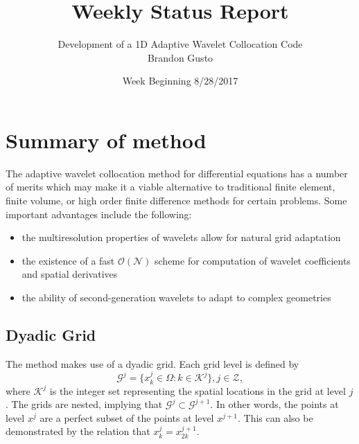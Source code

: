 \documentclass[11pt]{article}
\begin{document}
\title{Weekly Status Report}
\author{Development of a 1D Adaptive Wavelet Collocation Code \\
Brandon Gusto \\}
\date{Week Beginning 8/28/2017}

\maketitle
%
\section{Summary of method}
The adaptive wavelet collocation method for differential equations has a number of merits which may make it a viable
alternative to traditional finite element, finite volume, or high order finite difference methods for certain problems. 
Some important advantages include the following:
\begin{itemize}
    \item the multiresolution properties of wavelets allow for natural grid adaptation
    \item the existence of a fast $\mathcal{O}(\mathcal{N})$ scheme for computation of wavelet coefficients and 
          spatial derivatives
    \item the ability of second-generation wavelets to adapt to complex geometries
\end{itemize}
\subsection{Dyadic Grid}
The method makes use of a dyadic grid. Each grid level is defined by 
\begin{equation}
    \mathcal{G}^j= \{ x_{k}^{j} \in \Omega : k \in \mathcal{K}^j \}, j \in \mathcal{Z},
\end{equation}
where $\mathcal{K}^j$ is the integer set representing the spatial locations in the grid at level $j$. The grids are 
nested, implying that $\mathcal{G}^{j} \subset \mathcal{G}^{j+1}$. In other words, the points at level $x^{j}$ are 
a perfect subset of the points at level $x^{j+1}$. This can also be demonstrated by the relation that 
$x_{k}^{j}=x_{2k}^{j+1}$.
\end{document}
